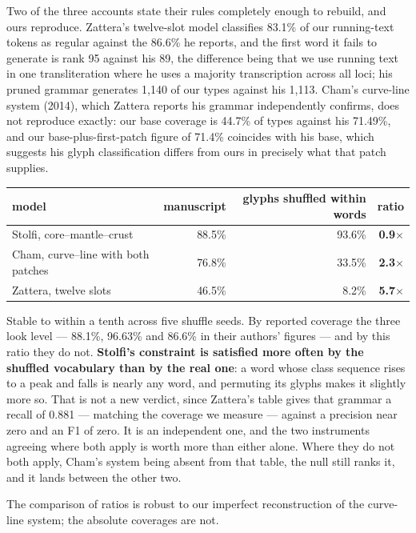 \documentclass[11pt,a4paper]{article}
\begin{document}
Two of the three accounts state their rules completely enough to rebuild, and ours reproduce. Zattera's twelve-slot model classifies 83.1\% of our running-text tokens as regular against the 86.6\% he reports, and the first word it fails to generate is rank 95 against his 89, the difference being that we use running text in one transliteration where he uses a majority transcription across all loci; his pruned grammar generates 1,140 of our types against his 1,113. Cham's curve-line system (2014), which Zattera reports his grammar independently confirms, does not reproduce exactly: our base coverage is 44.7\% of types against his 71.49\%, and our base-plus-first-patch figure of 71.4\% coincides with his base, which suggests his glyph classification differs from ours in precisely what that patch supplies.


\begin{table}[htbp]\centering\small
\begin{tabular}{@{}lrrr@{}}
\toprule
model & manuscript & glyphs shuffled within words & ratio \\
\midrule
Stolfi, core--mantle--crust & 88.5\% & 93.6\% & \textbf{0.9$\times$} \\
Cham, curve--line with both patches & 76.8\% & 33.5\% & \textbf{2.3$\times$} \\
Zattera, twelve slots & 46.5\% & 8.2\% & \textbf{5.7$\times$} \\
\bottomrule
\end{tabular}
\end{table}


Stable to within a tenth across five shuffle seeds. By reported coverage the three look level --- 88.1\%, 96.63\% and 86.6\% in their authors' figures --- and by this ratio they do not. \textbf{Stolfi's constraint is satisfied more often by the shuffled vocabulary than by the real one}: a word whose class sequence rises to a peak and falls is nearly any word, and permuting its glyphs makes it slightly more so. That is not a new verdict, since Zattera's table gives that grammar a recall of 0.881 --- matching the coverage we measure --- against a precision near zero and an F1 of zero. It is an independent one, and the two instruments agreeing where both apply is worth more than either alone. Where they do not both apply, Cham's system being absent from that table, the null still ranks it, and it lands between the other two.


The comparison of ratios is robust to our imperfect reconstruction of the curve-line system; the absolute coverages are not.
\end{document}
